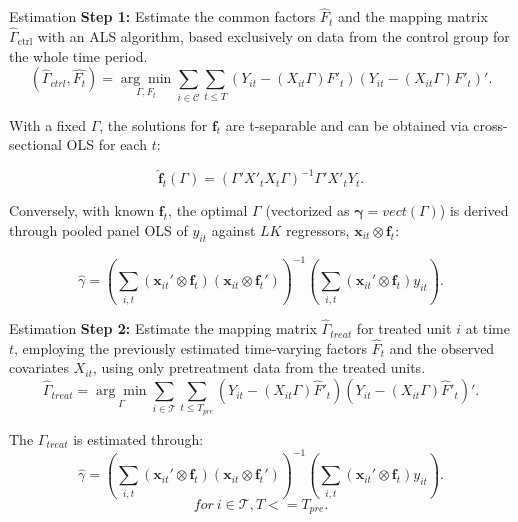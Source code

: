\documentclass{beamer}
\begin{document}
\begin{frame}{Estimation}
    \textbf{Step 1:} Estimate the common factors $\hat{F}_t$ and the mapping matrix $\hat{\Gamma}_{\text{ctrl}}$ with an ALS algorithm, based exclusively on data from the control group for the whole time period.
    \begin{equation*}
    (\hat{\Gamma}_{ctrl}, \hat{F_t}) = \underset{\Gamma, F_t}{\arg\min} \sum_{i \in \mathcal{C}} \sum_{t \leq T}\left( Y_{it} - (X_{it}\Gamma) F'_{t} \right)\left( Y_{it} - (X_{it}\Gamma) F'_{t} \right)'.
    \end{equation*}
    
    With a fixed $\Gamma$, the solutions for $\boldsymbol{f}_t$ are t-separable and can be obtained via cross-sectional OLS for each $t$:
    
    \begin{equation*}
    \hat{\boldsymbol{f}}_t(\Gamma) = (\Gamma' X'_t X_t \Gamma)^{-1} \Gamma' X'_t Y_t.
    \end{equation*}
    
    Conversely, with known $\boldsymbol{f}_{t}$, the optimal $\Gamma$ (vectorized as $\boldsymbol{\gamma} = vect(\Gamma)$) is derived through pooled panel OLS of $y_{it}$ against $LK$ regressors, $\boldsymbol{x}_{it} \otimes \boldsymbol{f}_t$:
    
    \begin{equation*}
    \hat{\gamma} = \left( \sum_{i,t} (\boldsymbol{x}_{it}' \otimes \boldsymbol{f}_t) (\boldsymbol{x}_{it} \otimes \boldsymbol{f}_t') \right)^{-1} \left( \sum_{i,t} (\boldsymbol{x}_{it}' \otimes \boldsymbol{f}_t) y_{it} \right).
    \end{equation*}
\end{frame}

\begin{frame}{Estimation}
    \textbf{Step 2:} Estimate the mapping matrix $\hat{\Gamma}_{treat}$ for treated unit $i$ at time $t$, employing the previously estimated time-varying factors $\hat{F}_t$ and the observed covariates $X_{it}$, using only pretreatment data from the treated units.
    \begin{equation*}
    \hat{\Gamma}_{treat} = \underset{\Gamma}{\arg\min} \sum_{i \in \mathcal{T}} \sum_{t \leq T_{pre}} \left( Y_{it} - (X_{it} \Gamma) \hat{F}'_{t} \right) \left( Y_{it} - (X_{it} \Gamma) \hat{F}'_{t} \right)'.
    \end{equation*}
    
    The $\Gamma_{treat}$ is estimated through:
    \begin{equation*}
        \hat{\gamma} = \left( \sum_{i,t} (\boldsymbol{x}_{it}' \otimes \boldsymbol{f}_t) (\boldsymbol{x}_{it} \otimes \boldsymbol{f}_t') \right)^{-1} \left( \sum_{i,t} (\boldsymbol{x}_{it}' \otimes \boldsymbol{f}_t) y_{it} \right).
    \end{equation*}
    $$for \ i \in \mathcal{T}, T<= T_{pre}.$$
\end{frame}
\end{document}
